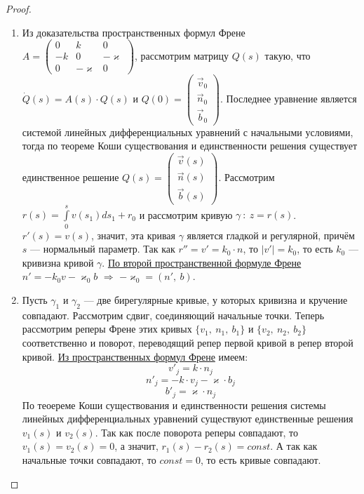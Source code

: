 \documentclass[12pt]{article}
\newcommand\tab[1][.5cm]{\hspace*{#1}}
\theoremstyle{plain}
\begin{document}
    \begin{proof}\tab
        \begin{enumerate}
            \item Из доказательства пространственных формул Френе $A=\begin{pmatrix}
                0 & k & 0\\
                -k & 0 & -\varkappa\\
                0 & -\varkappa & 0
            \end{pmatrix}$, рассмотрим матрицу $Q(s)$ такую, что $\dot{Q}(s)=A(s)\cdot Q(s)$ и $Q(0)=\begin{pmatrix}
                \vec{v}_0\\
                \vec{n}_0\\
                \vec{b}_0
            \end{pmatrix}$. Последнее уравнение является системой линейных дифференциальных уравнений с начальными условиями, тогда по теореме Коши существования и единственности решения существует единственное решение $Q(s)=\begin{pmatrix}
                \vec{v}(s)\\
                \vec{n}(s)\\
                \vec{b}(s)
            \end{pmatrix}$. Рассмотрим $r(s)=\int\limits_0^sv(s_1)ds_1+r_0$ и рассмотрим кривую $\gamma \ : \ z=r(s)$. $r'(s)=v(s)$, значит, эта кривая $\gamma$ является гладкой и регулярной, причём $s$ --- нормальный параметр. Так как $r''=v'=k_0\cdot n$, то $|v'|=k_0$, то есть $k_0$ --- кривизна кривой $\gamma$. \hyperlink{4}{По второй пространственной формуле Френе} $n'=-k_0v-\varkappa_0b$ $\Longrightarrow$ $-\varkappa_0=(n', \ b)$.
            \item Пусть $\gamma_1$ и $\gamma_2$ --- две бирегулярные кривые, у которых кривизна и кручение совпадают. Рассмотрим сдвиг, соединяющий начальные точки. Теперь рассмотрим реперы Френе этих кривых $\{v_1, \ n_1, \ b_1\}$ и $\{v_2, \ n_2, \ b_2\}$ соответственно и поворот, переводящий репер первой кривой в репер второй кривой. \hyperlink{4}{Из пространственных формул Френе} имеем:
            $$v'_j=k\cdot n_j$$
            $$n'_j=-k\cdot v_j-\varkappa\cdot b_j$$
            $$b'_j=\varkappa\cdot n_j$$
            По теоереме Коши существования и единственности решения системы линейных дифференциальных уравнений существуют единственные решения $v_1(s)$ и $v_2(s)$. Так как после поворота реперы совпадают, то $v_1(s)=v_2(s)=0$, а значит, $r_1(s)-r_2(s)=const$. А так как начальные точки совпадают, то $const=0$, то есть кривые совпадают.
        \end{enumerate}
    \end{proof}
\end{document}

